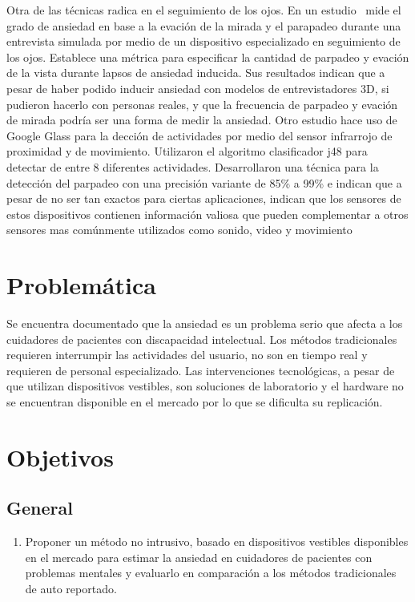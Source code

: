 \documentclass[letterpaper,12pt]{cicese}
\begin{document}
				Otra de las t\'ecnicas radica en el seguimiento de los ojos. En un estudio \citep{Kwon2009} mide el grado de ansiedad en base a la evaci\'on de la mirada y el parapadeo durante una entrevista simulada por medio de un dispositivo especializado en seguimiento de los ojos. Establece una m\'etrica para especificar la cantidad de parpadeo y evaci\'on de la vista durante lapsos de ansiedad inducida. Sus resultados indican que a pesar de haber podido inducir ansiedad con modelos de entrevistadores 3D, si pudieron hacerlo con personas reales, y que la frecuencia de parpadeo y evaci\'on de mirada podr\'ia ser una forma de medir la ansiedad. Otro estudio hace uso de Google Glass para la decci\'on de actividades por medio del sensor infrarrojo de proximidad y de movimiento. Utilizaron el algoritmo clasificador j48 para detectar de entre 8 diferentes actividades. Desarrollaron una t\'ecnica para la detecci\'on del parpadeo con una precisi\'on variante de 85\% a 99\% e indican que a pesar de no ser tan exactos para ciertas aplicaciones, indican que los sensores de estos dispositivos contienen informaci\'on valiosa que pueden complementar a otros sensores mas com\'unmente utilizados como sonido, video y movimiento \citep{Ishimaru2014}
					
		\chapter{Problem\'atica}
			Se encuentra documentado que la ansiedad es un problema serio que afecta a los cuidadores de pacientes con discapacidad intelectual. Los m\'etodos tradicionales requieren interrumpir las actividades del usuario, no son en tiempo real y requieren de personal especializado. Las intervenciones tecnol\'ogicas, a pesar de que utilizan dispositivos vestibles, son soluciones de laboratorio y el hardware no se encuentran disponible en el mercado por lo que se dificulta su replicaci\'on. 
		\chapter{Objetivos}
			\section{General}
				\begin{enumerate}
					\item Proponer un m\'etodo no intrusivo, basado en dispositivos vestibles disponibles en el mercado  para estimar la ansiedad en cuidadores de pacientes con problemas mentales y evaluarlo en comparaci\'on a los m\'etodos tradicionales de auto reportado.
				\end{enumerate}
\end{document}
